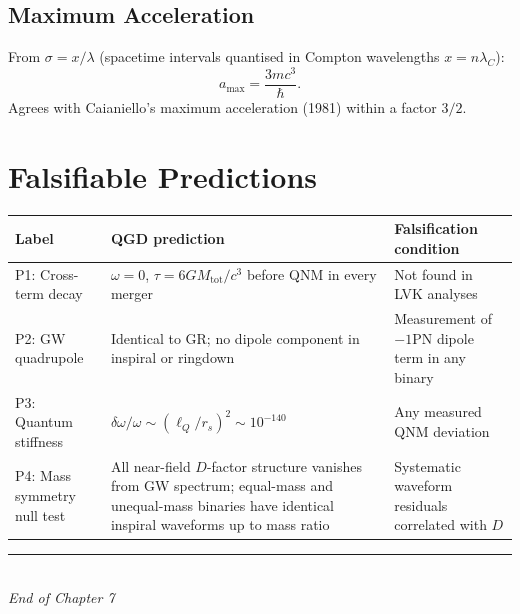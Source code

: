 \documentclass[12pt,a4paper]{article}
\newcommand{\lQ}{\ell_Q}
\begin{document}
\subsection{Maximum Acceleration}

From $\sigma = x/\lambda$ (spacetime intervals quantised in Compton wavelengths
$x = n\lambda_C$):
\begin{equation}
  \boxed{a_\mathrm{max} = \frac{3mc^3}{\hbar}.}
\end{equation}
Agrees with Caianiello's maximum acceleration (1981) within a factor $3/2$.

\section{Falsifiable Predictions}

\begin{center}
\renewcommand{\arraystretch}{1.35}
\begin{tabular}{p{2.8cm}p{6cm}p{4cm}}
\toprule
Label & QGD prediction & Falsification condition\\
\midrule
P1: Cross-term decay
  & $\omega=0$, $\tau = 6GM_\mathrm{tot}/c^3$ before QNM in every merger
  & Not found in LVK analyses\\[4pt]
P2: GW quadrupole
  & Identical to GR; no dipole component in inspiral or ringdown
  & Measurement of $-1$PN dipole term in any binary\\[4pt]
P3: Quantum stiffness
  & $\delta\omega/\omega \sim (\lQ/r_s)^2 \sim 10^{-140}$
  & Any measured QNM deviation\\[4pt]
P4: Mass symmetry null test
  & All near-field $D$-factor structure vanishes from GW spectrum; equal-mass and
    unequal-mass binaries have identical inspiral waveforms up to mass ratio
  & Systematic waveform residuals correlated with $D$\\
\bottomrule
\end{tabular}
\end{center}

\bigskip
\begin{center}
\rule{0.5\textwidth}{0.4pt}\\[4pt]
\textit{End of Chapter 7}
\end{center}
\end{document}
